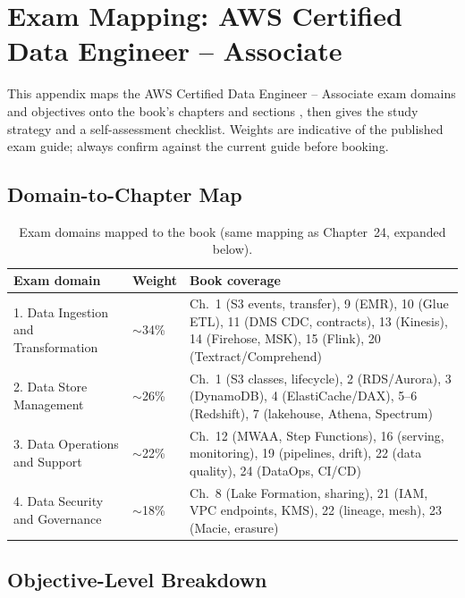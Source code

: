 \chapter{Exam Mapping: AWS Certified Data Engineer -- Associate}
%
This appendix maps the AWS Certified Data Engineer -- Associate exam domains and objectives onto
the book's chapters and sections \cite{awsCertDataEngineer}, then gives the study strategy and a
self-assessment checklist. Weights are indicative of the published exam guide; always confirm
against the current guide before booking.

\section{Domain-to-Chapter Map}
%

\begin{table}[H]
\centering
\small
\begin{tabular}{@{}p{4.6cm}p{1.8cm}p{6.6cm}@{}}
\toprule
\textbf{Exam domain} & \textbf{Weight} & \textbf{Book coverage} \\
\midrule
1. Data Ingestion and Transformation & $\sim$34\% & Ch.\ 1 (S3 events, transfer), 9 (EMR), 10 (Glue ETL), 11 (DMS CDC, contracts), 13 (Kinesis), 14 (Firehose, MSK), 15 (Flink), 20 (Textract/Comprehend) \\
2. Data Store Management & $\sim$26\% & Ch.\ 1 (S3 classes, lifecycle), 2 (RDS/Aurora), 3 (DynamoDB), 4 (ElastiCache/DAX), 5--6 (Redshift), 7 (lakehouse, Athena, Spectrum) \\
3. Data Operations and Support & $\sim$22\% & Ch.\ 12 (MWAA, Step Functions), 16 (serving, monitoring), 19 (pipelines, drift), 22 (data quality), 24 (DataOps, CI/CD) \\
4. Data Security and Governance & $\sim$18\% & Ch.\ 8 (Lake Formation, sharing), 21 (IAM, VPC endpoints, KMS), 22 (lineage, mesh), 23 (Macie, erasure) \\
\bottomrule
\end{tabular}
\caption{Exam domains mapped to the book (same mapping as Chapter~24, expanded below).}
\label{tab:app-exam-domains}
\end{table}

\section{Objective-Level Breakdown}
